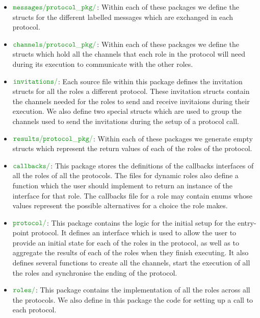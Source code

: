 \documentclass[12pt,twoside]{report}
\begin{document}
\begin{itemize}
    \item $\dirname{messages}\dirname{protocol\_pkg}$: Within each of these packages we define the structs for the different labelled messages which are exchanged in each protocol.
    \item  $\dirname{channels}\dirname{protocol\_pkg}$: Within each of these packages we define the structs which hold all the channels that each role in the protocol will need during its execution to communicate with the other roles.
    \item $\dirname{invitations}$: Each source file within this package defines the invitation structs for all the roles a different protocol. These invitation structs contain the channels needed for the roles to send and receive invitaions during their execution. We also define two special structs which are used to group the channels used to send the invitations during the setup of a protocol call. 
    \item $\dirname{results}\dirname{protocol\_pkg}$: Within each of these packages we generate empty structs which represent the return values of each of the roles of the protocol.
    \item $\dirname{callbacks}$: This package stores the definitions of the callbacks interfaces of all the roles of all the protocols. The files for dynamic roles also define a function which the user should implement to return an instance of the interface for that role. The callbacks file for a role may contain enums whose values represent the possible alternatives for a choice the role makes.
    \item $\dirname{protocol}$: This package contains the logic for the initial setup for the entry-point protocol. It defines an interface which is used to allow the user to provide an initial state for each of the roles in the protocol, as well as to aggregate the results of each of the roles when they finish executing. It also defines several functions to create all the channels, start the execution of all the roles and synchronise the ending of the protocol.
    \item $\dirname{roles}$: This package contains the implementation of all the roles across all the protocols. We also define in this package the code for setting up a call to each protocol.
\end{itemize}
\end{document}
